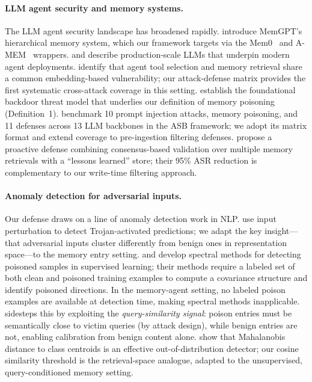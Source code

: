 \paragraph{LLM agent security and memory systems.}
The LLM agent security landscape has broadened rapidly.
\citet{memgpt2023} introduce MemGPT's hierarchical memory system, which
our framework targets via the Mem0~\citep{mem0} and A-MEM~\citep{amem}
wrappers.  \citet{touvron2023llama} and \citet{openai2023gpt4} describe
production-scale LLMs that underpin modern agent deployments.
\citet{yang2024watch} identify that agent tool selection and memory retrieval
share a common embedding-based vulnerability; our attack-defense matrix
provides the first systematic cross-attack coverage in this setting.
\citet{gu2019badnets} establish the foundational backdoor threat model
that underlies our definition of memory poisoning (Definition~1).
\citet{zhang2024asb} benchmark 10 prompt injection attacks, memory poisoning,
and 11 defenses across 13 LLM backbones in the ASB framework; we adopt
its matrix format and extend coverage to pre-ingestion filtering defenses.
\citet{amemguard2025} propose a proactive defense combining consensus-based
validation over multiple memory retrievals with a ``lessons learned'' store;
their 95\% ASR reduction is complementary to our write-time filtering approach.

\paragraph{Anomaly detection for adversarial inputs.}
Our \sad{} defense draws on a line of anomaly detection work in NLP.
\citet{gao2019strip} use input perturbation to detect Trojan-activated
predictions; we adapt the key insight---that adversarial inputs cluster
differently from benign ones in representation space---to the memory entry
setting.  \citet{goldblum2022dataset} and \citet{hayase2021spectre} develop
spectral methods for detecting poisoned samples in supervised learning;
their methods require a labeled set of both clean and poisoned training examples
to compute a covariance structure and identify poisoned directions.
In the memory-agent setting, no labeled poison examples are available at
detection time, making spectral methods inapplicable.
\sad{} sidesteps this by exploiting the \emph{query-similarity signal}:
poison entries must be semantically close to victim queries (by attack
design), while benign entries are not, enabling calibration from benign
content alone.  \citet{lee2018simple} show that Mahalanobis distance to
class centroids is an effective out-of-distribution detector;
our cosine similarity threshold is the retrieval-space analogue, adapted
to the unsupervised, query-conditioned memory setting.
